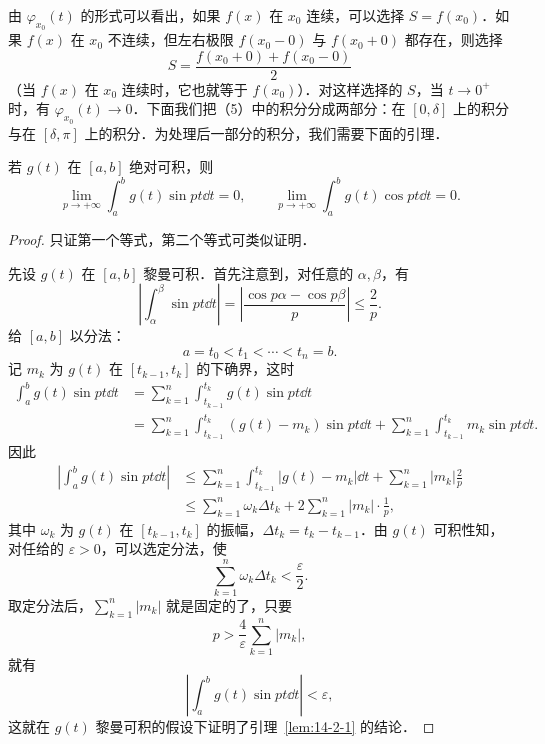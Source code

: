 由 $\varphi_{x_{0}}(t)$ 的形式可以看出，如果 $f(x)$ 在 $x_{0}$ 连续，可以选择 $S=f(x_{0})$．如果 $f(x)$ 在 $x_{0}$ 不连续，但左右极限 $f(x_{0}-0)$ 与 $f(x_{0}+0)$ 都存在，则选择
\[
S=\frac{f(x_{0}+0)+f(x_{0}-0)}{2}
\]
（当 $f(x)$ 在 $x_{0}$ 连续时，它也就等于 $f(x_{0})$）．对这样选择的 $S$，当 $t\to 0^{+}$ 时，有 $\varphi_{x_{0}}(t)\to 0$．下面我们把（5）中的积分分成两部分：在 $[0,\delta]$ 上的积分与在 $[\delta,\pi]$ 上的积分．为处理后一部分的积分，我们需要下面的引理．

\begin{lemma}\label{lem:14-2-1}
若 $g(t)$ 在 $[a,b]$ 绝对可积，则
\[
\lim_{p\to+\infty}\int_{a}^{b}g(t)\sin pt\dd t=0,\qquad\lim_{p\to+\infty}\int_{a}^{b}g(t)\cos pt\dd t=0.
\]
\end{lemma}

\begin{proof}
只证第一个等式，第二个等式可类似证明．

先设 $g(t)$ 在 $[a,b]$ 黎曼可积．首先注意到，对任意的 $\alpha,\beta$，有
\[
\left|\int_{\alpha}^{\beta}\sin pt\dd t\right|=\left|\frac{\cos p\alpha-\cos p\beta}{p}\right|\leqslant\frac{2}{p}.
\]
给 $[a,b]$ 以分法：
\[
a=t_{0}<t_{1}<\cdots<t_{n}=b.
\]
记 $m_{k}$ 为 $g(t)$ 在 $[t_{k-1},t_{k}]$ 的下确界，这时
\[
\begin{aligned}
\int_{a}^{b}g(t)\sin pt\dd t&=\sum_{k=1}^{n}\int_{t_{k-1}}^{t_{k}}g(t)\sin pt\dd t\\
&=\sum_{k=1}^{n}\int_{t_{k-1}}^{t_{k}}\left(g(t)-m_{k}\right)\sin pt\dd t+\sum_{k=1}^{n}\int_{t_{k-1}}^{t_{k}}m_{k}\sin pt\dd t.
\end{aligned}
\]
因此
\[
\begin{aligned}
\left|\int_{a}^{b}g(t)\sin pt\dd t\right|&\leqslant\sum_{k=1}^{n}\int_{t_{k-1}}^{t_{k}}\left|g(t)-m_{k}\right|\dd t+\sum_{k=1}^{n}\left|m_{k}\right|\frac{2}{p}\\
&\leqslant\sum_{k=1}^{n}\omega_{k}\Delta t_{k}+2\sum_{k=1}^{n}\left|m_{k}\right|\cdot\frac{1}{p},
\end{aligned}
\]
其中 $\omega_{k}$ 为 $g(t)$ 在 $[t_{k-1},t_{k}]$ 的振幅，$\Delta t_{k}=t_{k}-t_{k-1}$．由 $g(t)$ 可积性知，对任给的 $\varepsilon>0$，可以选定分法，使
\[
\sum_{k=1}^{n}\omega_{k}\Delta t_{k}<\frac{\varepsilon}{2}.
\]
取定分法后，$\displaystyle\sum_{k=1}^{n}\left|m_{k}\right|$ 就是固定的了，只要
\[
p>\frac{4}{\varepsilon}\sum_{k=1}^{n}\left|m_{k}\right|,
\]
就有
\[
\left|\int_{a}^{b}g(t)\sin pt\dd t\right|<\varepsilon,
\]
这就在 $g(t)$ 黎曼可积的假设下证明了引理~\ref{lem:14-2-1} 的结论．


\end{proof}
